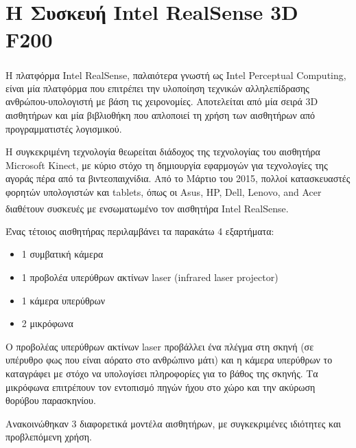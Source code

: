 \section{Η Συσκευή Intel\textsuperscript{\textregistered} RealSense\texttrademark{} 3D F200 }



Η πλατφόρμα Intel\textsuperscript{\textregistered} RealSense\texttrademark{}, παλαιότερα γνωστή ως Intel\textsuperscript{\textregistered} Perceptual Computing, είναι μία πλατφόρμα που επιτρέπει την υλοποίηση τεχνικών αλληλεπίδρασης ανθρώπου-υπολογιστή με βάση τις χειρονομίες. Αποτελείται από μία σειρά 3D αισθητήρων και μία βιβλιοθήκη που απλοποιεί τη χρήση των αισθητήρων από προγραμματιστές λογισμικού. \cite{RealsenseCamera}


Η συγκεκριμένη τεχνολογία θεωρείται διάδοχος της τεχνολογίας του αισθητήρα Microsoft Kinect, με κύριο στόχο τη δημιουργία εφαρμογών για τεχνολογίες της αγοράς πέρα από τα βιντεοπαιχνίδια. Από το Μάρτιο του 2015, πολλοί κατασκευαστές φορητών υπολογιστών και tablets\cite{Realsenselaptops}, όπως οι Asus, HP, Dell, Lenovo, and Acer διαθέτουν συσκευές με ενσωματωμένο τον αισθητήρα Intel\textsuperscript{\textregistered} RealSense\texttrademark{}. 


Ένας τέτοιος αισθητήρας περιλαμβάνει τα παρακάτω 4 εξαρτήματα: 


\begin{itemize}
  \item 1 συμβατική κάμερα
  \item 1 προβολέα υπερύθρων ακτίνων laser (infrared laser projector)
  \item 1 κάμερα υπερύθρων
  \item 2 μικρόφωνα
\end{itemize}



Ο προβολέας υπερύθρων ακτίνων laser προβάλλει ένα πλέγμα στη σκηνή (σε υπέρυθρο φως που είναι αόρατο στο ανθρώπινο μάτι) και η κάμερα υπερύθρων το καταγράφει με στόχο να υπολογίσει πληροφορίες για το βάθος της σκηνής.
Τα μικρόφωνα επιτρέπουν τον εντοπισμό πηγών ήχου στο χώρο και την ακύρωση θορύβου παρασκηνίου.


Ανακοινώθηκαν 3 διαφορετικά μοντέλα αισθητήρων, με συγκεκριμένες ιδιότητες και προβλεπόμενη χρήση. 


